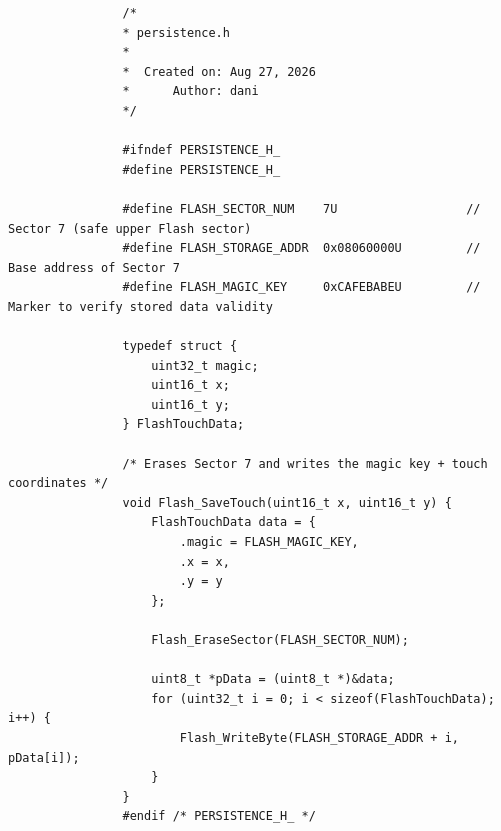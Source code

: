 \documentclass[../main.tex]{subfiles}
\begin{document}
            \begin{lstlisting}
                /*
                * persistence.h
                *
                *  Created on: Aug 27, 2026
                *      Author: dani
                */

                #ifndef PERSISTENCE_H_
                #define PERSISTENCE_H_

                #define FLASH_SECTOR_NUM    7U                  // Sector 7 (safe upper Flash sector)
                #define FLASH_STORAGE_ADDR  0x08060000U         // Base address of Sector 7
                #define FLASH_MAGIC_KEY     0xCAFEBABEU         // Marker to verify stored data validity

                typedef struct {
                    uint32_t magic;
                    uint16_t x;
                    uint16_t y;
                } FlashTouchData;

                /* Erases Sector 7 and writes the magic key + touch coordinates */
                void Flash_SaveTouch(uint16_t x, uint16_t y) {
                    FlashTouchData data = {
                        .magic = FLASH_MAGIC_KEY,
                        .x = x,
                        .y = y
                    };

                    Flash_EraseSector(FLASH_SECTOR_NUM);

                    uint8_t *pData = (uint8_t *)&data;
                    for (uint32_t i = 0; i < sizeof(FlashTouchData); i++) {
                        Flash_WriteByte(FLASH_STORAGE_ADDR + i, pData[i]);
                    }
                }
                #endif /* PERSISTENCE_H_ */
            \end{lstlisting}
\end{document}

